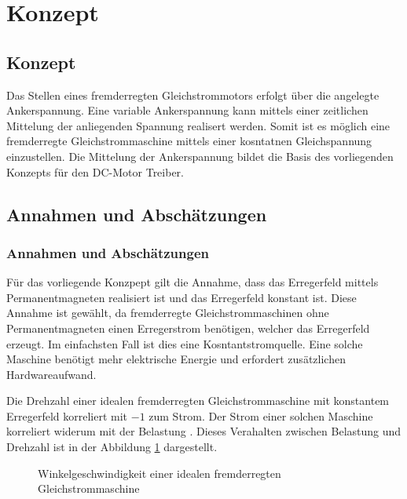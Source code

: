 \ifSTANDALONE
\section{Konzept}
\fi
\ifEMBED
\subsection{Konzept}
\fi

Das Stellen eines fremderregten Gleichstrommotors erfolgt über die
angelegte Ankerspannung. Eine variable Ankerspannung kann mittels einer 
zeitlichen Mittelung der anliegenden Spannung realisert werden. Somit
ist es möglich eine fremderregte Gleichstrommaschine mittels einer
kosntatnen Gleichspannung einzustellen. Die Mittelung der Ankerspannung
bildet die Basis des vorliegenden Konzepts für den DC-Motor Treiber.

\ifSTANDALONE
\subsection{Annahmen und Abschätzungen}\label{sec:annahmen}
\fi
\ifEMBED
\subsubsection{Annahmen und Abschätzungen}\label{sec:annahmen}
\fi
Für das vorliegende Konzpept gilt die Annahme, dass das Erregerfeld mittels
Permanentmagneten realisiert ist und das Erregerfeld konstant ist. Diese
Annahme ist gewählt, da fremderregte Gleichstrommaschinen ohne
Permanentmagneten einen Erregerstrom benötigen, welcher das Erregerfeld
erzeugt. Im einfachsten Fall ist dies eine Kosntantstromquelle. Eine solche
Maschine benötigt mehr elektrische Energie und erfordert zusätzlichen
Hardwareaufwand.

Die Drehzahl einer idealen fremderregten Gleichstrommaschine mit konstantem
Erregerfeld korreliert mit $-1$ zum Strom. Der Strom einer solchen Maschine
korreliert widerum mit der Belastung \cite[p.163]{smps}. Dieses Verahalten
zwischen Belastung und Drehzahl ist in der Abbildung \ref{fig:ideal-dc-curve}
dargestellt.

\begin{figure}[h!]
	\centering
	\caption{Winkelgeschwindigkeit einer idealen fremderregten 
		Gleichstrommaschine}
	\label{fig:ideal-dc-curve}
\end{figure}

